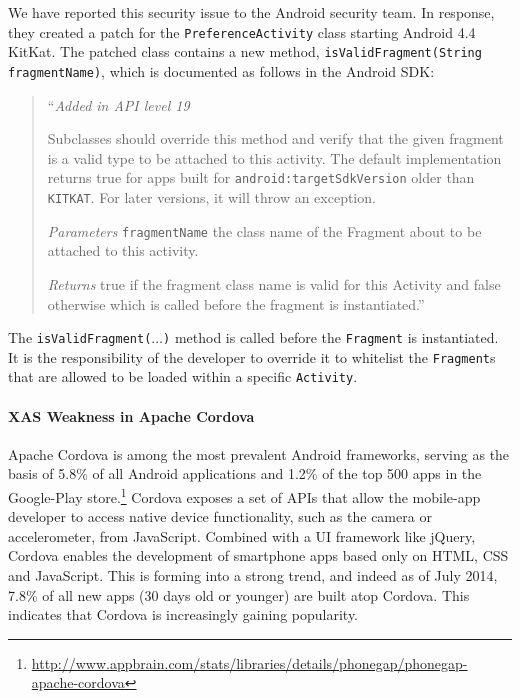 We have reported this security issue to the Android security team. In response, they
created a patch for the \texttt{PreferenceActivity} class starting Android 4.4 KitKat. 
The patched class contains a new method, \texttt{isValidFragment(String fragmentName)}, 
which is documented as follows in the Android SDK:
\begin{quote}
	``\textit{Added in API level 19}
	
	Subclasses should override this method and verify that the given fragment
	is a valid type to be attached to this activity. The default implementation
	returns true for apps built for \texttt{android:targetSdkVersion}
	older than \texttt{KITKAT}. For later versions, it will throw an exception.
	
	\textit{Parameters} \texttt{fragmentName} the class name of the Fragment
	about to be attached to this activity. 
	
	\textit{Returns} true if the fragment class name is valid for this
	Activity and false otherwise which is called before the fragment is
	instantiated.'' 
\end{quote}
The \texttt{isValidFragment($\ldots$)} method is called before the {\tt Fragment}
is instantiated.
It is the responsibility of the developer to override it to whitelist the {\tt Fragment}s that are allowed to be loaded within a specific
{\tt Activity}.

\paragraph{XAS Weakness in Apache Cordova}\label{Se:CordovaXAS}

Apache Cordova is among the most prevalent Android frameworks, serving as the basis of 5.8\% of all Android applications and 1.2\% of the top 500 apps in the Google-Play store.\footnote{\url{http://www.appbrain.com/stats/libraries/details/phonegap/phonegap-apache-cordova}} Cordova exposes a set of APIs that allow the mobile-app developer to access native device functionality, such as the camera or accelerometer, from JavaScript. Combined with a UI framework like jQuery, Cordova enables the development of smartphone apps based only
on HTML, CSS and JavaScript. This is forming into a strong trend, and indeed as of July 2014, 7.8\% of all new apps (30 days old or younger) are built atop Cordova. This indicates that Cordova is increasingly gaining popularity.

